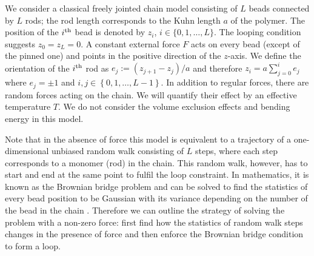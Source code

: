 \documentclass[aps,showpacs,twocolumn,floatfix,prx,superscriptaddress]{revtex4-1}
\begin{document}
We consider a classical freely jointed chain model consisting of $L$ beads connected by $L$ rods; the rod length corresponds to the Kuhn length $a$ of the polymer. The position of the $i^{\rm th}$ bead is denoted by $z_i$, $i\in\{0,1, \ldots,L\}$. The looping condition suggests $z_0=z_L=0$. A constant external force $F$ acts on every bead (except of the pinned one) and points in the positive direction of the $z$-axis.  We define the orientation of the $i^{\rm th}$ rod as $e_j:=(z_{j+1} - z_{j})/a$ and therefore $z_i =
a\sum_{j=0}^{i} e_j$ where $e_j=\pm 1$ and $i,j \in \left\{0, 1, \ldots,
    L-1\right\}$. In addition to regular forces, there are random forces acting on the chain. We will quantify their effect by an effective temperature $T$. We do not consider the volume exclusion effects and bending
energy in this model.

Note that in the absence of force this model is equivalent to a trajectory of a one-dimensional unbiased random walk consisting of $L$ steps, where each step corresponds to a monomer (rod) in the chain. This random walk, however, has to start and end at the same point to fulfil the loop constraint. In mathematics, it is known as the Brownian bridge problem and can be solved to find the statistics of every bead position to be Gaussian with its variance depending on the number of the bead in the chain \cite{}. Therefore we can outline the strategy of solving the problem with a non-zero force: first find how the statistics of random walk steps changes in the presence of force and then enforce the Brownian bridge condition to form a loop. 
\end{document}
